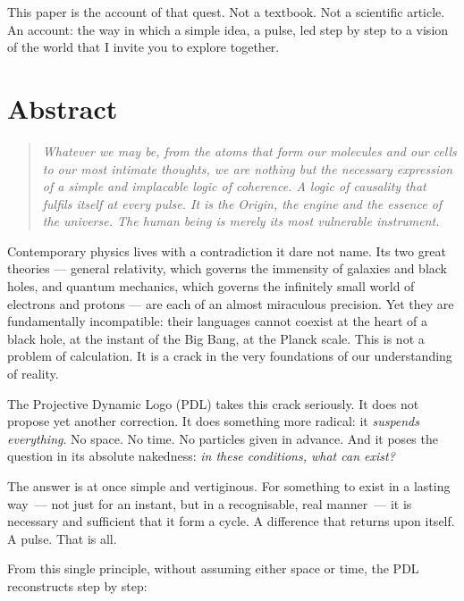 \documentclass[12pt, a4paper, openright]{book}
\begin{document}
\medskip

This paper is the account of that quest. Not a textbook. Not a scientific article. An account: the way in which a simple idea, a pulse, led step by step to a vision of the world that I invite you to explore together.

\chapter*{Abstract}

\begin{quote}
\textit{Whatever we may be, from the atoms that form our molecules and our cells to our most intimate thoughts, we are nothing but the necessary expression of a simple and implacable logic of coherence. A logic of causality that fulfils itself at every pulse. It is the Origin, the engine and the essence of the universe. The human being is merely its most vulnerable instrument.}
\end{quote}

\bigskip

Contemporary physics lives with a contradiction it dare not name. Its two great theories --- general relativity, which governs the immensity of galaxies and black holes, and quantum mechanics, which governs the infinitely small world of electrons and protons --- are each of an almost miraculous precision. Yet they are fundamentally incompatible: their languages cannot coexist at the heart of a black hole, at the instant of the Big Bang, at the Planck scale. This is not a problem of calculation. It is a crack in the very foundations of our understanding of reality.

\medskip

The Projective Dynamic Logo (PDL) takes this crack seriously. It does not propose yet another correction. It does something more radical: it \emph{suspends everything}. No space. No time. No particles given in advance. And it poses the question in its absolute nakedness: \emph{in these conditions, what can exist?}

\medskip

The answer is at once simple and vertiginous. For something to exist in a lasting way~--- not just for an instant, but in a recognisable, real manner~--- it is necessary and sufficient that it form a cycle. A difference that returns upon itself. A pulse. That is all.

\medskip

From this single principle, without assuming either space or time, the PDL reconstructs step by step:
\end{document}

